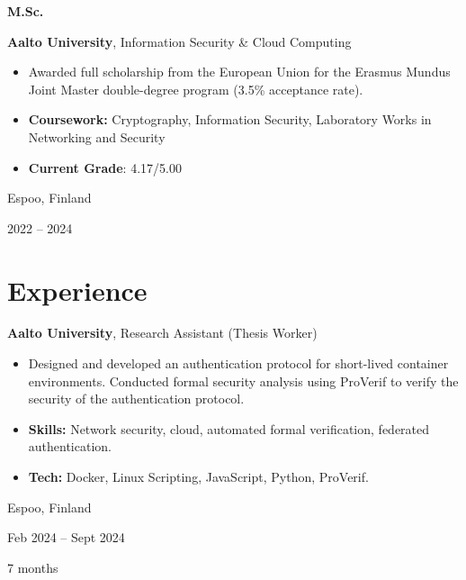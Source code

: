 \documentclass[10pt, a4paper]{article}
\newenvironment{highlights}{
    \begin{itemize}[
        topsep=0.10 cm,
        parsep=0.10 cm,
        partopsep=0pt,
        itemsep=0pt,
        leftmargin=0 cm + 10pt
    ]
}{
    \end{itemize}
} %
\newenvironment{twocolentry}[2][]{
    \onecolentry
    \def\secondColumn{#2}
    \setcolumnwidth{\fill, 3.1 cm}
    \begin{paracol}{2}
}{
    \switchcolumn \raggedleft \secondColumn
    \end{paracol}
    \endonecolentry
} %
\newenvironment{threecolentry}[3][]{
    \onecolentry
    \def\thirdColumn{#3}
    \setcolumnwidth{1 cm, \fill, 3.1 cm}
    \begin{paracol}{3}
    {\raggedright #2} \switchcolumn
}{
    \switchcolumn \raggedleft \thirdColumn
    \end{paracol}
    \endonecolentry
} %
\begin{document}
        \vspace{0.2 cm}

        \begin{threecolentry}{\textbf{M.Sc.}}{
            Espoo, Finland

        2022 – 2024
        }
            \textbf{Aalto University}, Information Security \& Cloud Computing
            \begin{highlights}
                \item Awarded full scholarship from the European Union for the Erasmus Mundus Joint Master double-degree program (3.5\% acceptance rate).
                \item \textbf{Coursework:} Cryptography, Information Security, Laboratory Works in Networking and Security
                \item \textbf{Current Grade}: 4.17/5.00
            \end{highlights}
        \end{threecolentry}


    
    \section{Experience}



        
        \begin{twocolentry}{
            Espoo, Finland

        Feb 2024 – Sept 2024

        7 months
        }
            \textbf{Aalto University}, Research Assistant (Thesis Worker)
            \begin{highlights}
                \item Designed and developed an authentication protocol for short-lived container environments. Conducted formal security analysis using ProVerif to verify the security of the authentication protocol.
                \item \textbf{Skills:} Network security, cloud, automated formal verification, federated authentication.
                \item \textbf{Tech:} Docker, Linux Scripting, JavaScript, Python, ProVerif.
            \end{highlights}
        \end{twocolentry}


        \vspace{0.2 cm}
\end{document}

